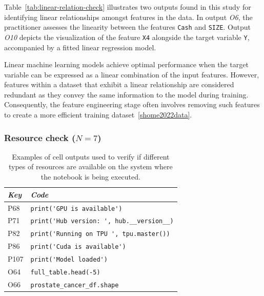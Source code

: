 Table~\ref{tab:linear-relation-check} illustrates two outputs found in this study for identifying linear relationships amongst features in the data. In output \emph{O6}, the practitioner assesses the linearity between the features \texttt{Cash} and \texttt{SIZE}. Output \emph{O10} depicts the visualization of the feature \texttt{X4} alongside the target variable \texttt{Y}, accompanied by a fitted linear regression model.

Linear machine learning models achieve optimal performance when the target variable can be expressed as a linear combination of the input features. However, features within a dataset that exhibit a linear relationship are considered redundant as they convey the same information to the model during training. Consequently, the feature engineering stage often involves removing such features to create a more efficient training dataset~\ref{shome2022data}.


\subsubsection{Resource check ($N = 7$)}\label{sec:implicit-resource-check}

\begin{table}
  \centering
  \caption{Examples of cell outputs used to verify if different types of resources are available on the system where the notebook is being executed.}
  \begin{tabular}{@{}m{} m{}@{}}
    \toprule
    \emph{\textbf{Key}}&
    \emph{\textbf{Code}}\\
    \midrule

    P68&
    \lstinline[]$print('GPU is available')$\\

    P71&
    \lstinline[]$print('Hub version: ', hub.__version__)$\\

    P82&
    \lstinline[]$print('Running on TPU ', tpu.master())$\\

    P86&
    \lstinline[]$print('Cuda is available')$\\

    P107&
    \lstinline[]$print('Model loaded')$\\

    O64&
    \lstinline[]$full_table.head(-5)$\\

    O66&
    \lstinline[]$prostate_cancer_df.shape$\\
    \bottomrule
  \end{tabular}
  \label{tab:resource-check}
\end{table}

